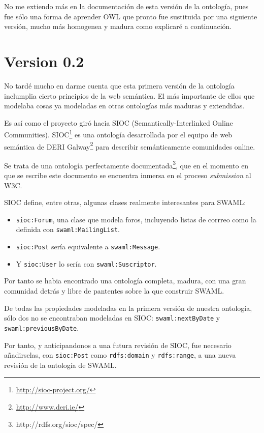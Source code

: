 No me extiendo más en la documentación de esta versión de la ontología, pues
fue sólo una forma de aprender OWL que pronto fue sustituida por una siguiente
versión, mucho más homogenea y madura como explicaré a continuación.


\section{Version 0.2}

No tardé mucho en darme cuenta que esta primera versión de la ontología inclumplia
cierto principios de la web semántica. El más importante de ellos que modelaba
cosas ya modeladas en otras ontologías más maduras y extendidas.

Es así como el proyecto giró hacia SIOC\cite{Breslin2005} (Semantically-Interlinked 
Online Communities). SIOC\footnote{\url{http://sioc-project.org/}} es una ontología 
desarrollada por el equipo de web semántica de DERI Galway\footnote{\url{http://www.deri.ie/}} 
para describir semánticamente comunidades online.

Se trata de una ontología perfectamente documentada\footnote{http://rdfs.org/sioc/spec/},
que en el momento en que se escribe este documento se encuentra inmersa en el 
proceso \emph{submission} al W3C.

SIOC define, entre otras, algunas clases realmente interesantes para SWAML:

\begin{itemize}
  \item \texttt{sioc:Forum}, una clase que modela foros, incluyendo listas de corrreo
	como la definida con \texttt{swaml:MailingList}.
  \item \texttt{sioc:Post} sería equivalente a \texttt{swaml:Message}.
  \item Y \texttt{sioc:User} lo sería con \texttt{swaml:Suscriptor}.
\end{itemize}

Por tanto se habia encontrado una ontología completa, madura, con una gran 
comunidad detrás y libre de pantentes sobre la que construir SWAML.

De todas las propiedades modeladas en la primera versión de nuestra ontología,
sólo dos no se encontraban modeladas en SIOC: \texttt{swaml:nextByDate} y
\texttt{swaml:previousByDate}. 

Por tanto, y anticipandonos a una futura revisión de SIOC, fue necesario añadirselas, 
con \texttt{sioc:Post} como \texttt{rdfs:domain} y \texttt{rdfs:range}, a una 
nueva revisión de la ontología de SWAML.

